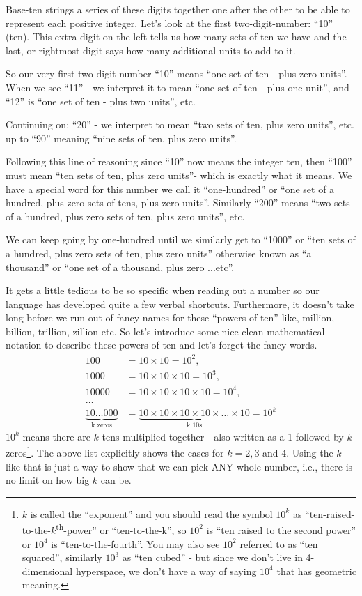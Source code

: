 \documentclass{article}
\begin{document}
Base-ten strings a series of these digits together
one after the other to be able to represent each positive integer.
Let's look at the first two-digit-number: ``10'' (ten).
This extra digit on the left tells us how many sets of ten we have and the last,
or rightmost digit says how many additional units to add to it.

So our very first two-digit-number ``10'' means ``one set of ten - plus zero units''.
When we see ``11'' - we interpret it to mean ``one set of ten - plus one unit'',
and ``12'' is ``one set of ten - plus two units'', etc.

Continuing on; ``20'' - we interpret to mean ``two sets of ten,
plus zero units'', etc. up to ``90'' meaning ``nine sets of ten,
plus zero units''.

Following this line of reasoning since ``10'' now means the integer ten,
then ``100'' must mean ``ten sets of ten,
plus zero units''- which is exactly what it means.
We have a special word for this number we call it ``one-hundred'' or ``one set of a hundred,
plus zero sets of tens, plus zero units''.
Similarly ``200'' means ``two sets of a hundred, plus zero sets of ten,
plus zero units'', etc.

We can keep going by one-hundred until we similarly get to ``1000'' or ``ten sets of a hundred,
plus zero sets of ten, plus zero units'' otherwise known
as ``a thousand'' or ``one set of a thousand, plus zero ...etc''.

It gets a little tedious to be so specific when reading out
a number so our language has developed quite a few verbal shortcuts.
Furthermore, it doesn't take long before we run out of fancy names
for these ``powers-of-ten'' like, million, billion, trillion,
zillion etc. So let's introduce some nice clean mathematical notation
to describe these powers-of-ten and let's forget the fancy words.
\begin{align*}
100&=10\times10=10^2,\\
1000&= 10\times10\times10=10^3,\\
10000&= 10\times10\times10\times10=10^4,\\
\dots{}\\
\underbrace{10\dots{}000}_\text{k zeros}&=
\underbrace{10\times10\times10\times10\times\dots{}\times10}_\text{k 10s}=10^k
\end{align*}
$10^k$ means there are $k$ tens multiplied together - 
also written as a 1 followed by $k$ zeros\footnote{$k$ is called the ``exponent'' and you should
read the symbol $10^k$ as ``ten-raised-to-the-$k$\textsuperscript{th}-power'' or ``ten-to-the-k'',
so $10^2$ is ``ten raised to the second power'' or $10^4$ is ``ten-to-the-fourth''.
You may also see $10^2$ referred to as ``ten squared'',
similarly $10^3$ as ``ten cubed'' - but since we 
don't live in 4-dimensional hyperspace,
we don't have a way of saying $10^4$ that has geometric meaning.}.
The above list explicitly shows the cases for $k = 2, 3$ and $4$.
Using the $k$ like that is just a way to show that we can pick ANY whole number,
i.e., there is no limit on how big $k$ can be.
\end{document}
